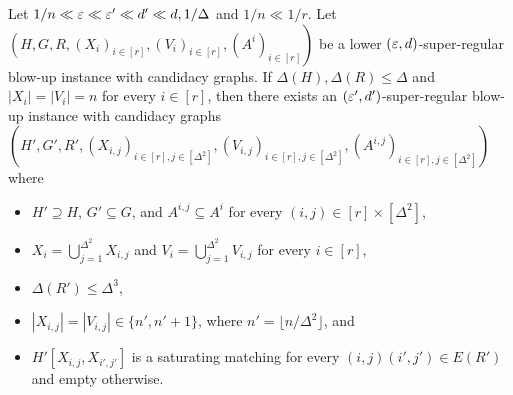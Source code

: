 \documentclass[11pt]{amsart}
\begin{document}
\begin{lemma}\label{lem:blow-up-reduction-to-auxiliary}
Let $1 / n \ll \varepsilon \ll \varepsilon' \ll d' \ll d, 1 / \Delta$ and $1 / n \ll 1 / r$.
Let $\left(H, G, R, (X_i)_{i\in [r]}\right.,\allowbreak (V_i)_{i\in [r]},\left.(A^i)_{i \in [r]}\right)$ be a lower $(\varepsilon, d)$-super-regular blow-up instance with candidacy graphs.  If $\Delta(H), \Delta(R) \leq \Delta$ and $|X_i| = |V_i| = n$ for every $i \in [r]$, then there exists an $(\varepsilon', d')$-super-regular blow-up instance with candidacy graphs $(H', G', R', (X_{i,j})_{i\in [r],j\in[\Delta^2]}, (V_{i,j})_{i\in [r],j\in[\Delta^2]}, (A^{i,j})_{i \in [r],j\in[\Delta^2]})$ where 
\begin{itemize}
    \item $H' \supseteq H$, $G' \subseteq G$, and $A^{i,j} \subseteq A^i$ for every $(i,j) \in [r]\times[\Delta^2]$,
    \item $X_i = \bigcup_{j=1}^{\Delta^2} X_{i,j}$ and $V_i = \bigcup_{j=1}^{\Delta^2} V_{i,j}$ for every $i \in [r]$,
    \item $\Delta(R') \leq \Delta^3$, 
    \item $|X_{i,j}| = |V_{i,j}| \in \{n', n'+1\}$, where $n' = \lfloor n / \Delta^2\rfloor$, and
    \item $H'[X_{i,j}, X_{i',j'}]$ is a saturating matching for every $(i,j)(i',j') \in E(R')$ and empty otherwise.
\end{itemize}
\end{lemma}
\end{document}
